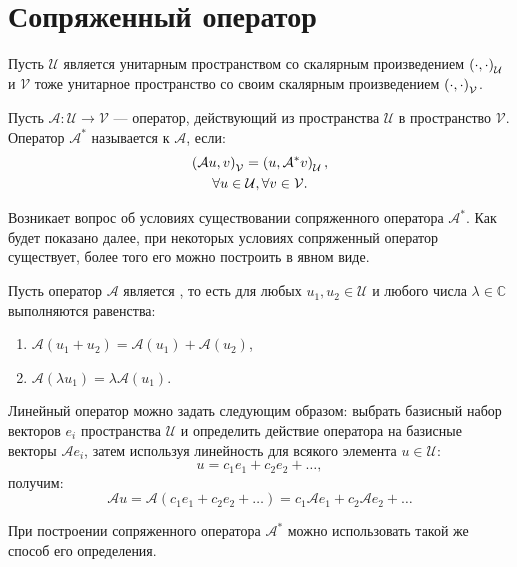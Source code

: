 \section{Сопряженный оператор}

Пусть $\mathcal{U}$ является унитарным пространством со скалярным произведением $\left ( \cdot, \cdot \right )_\mathcal{U}$ и $\mathcal{V}$ тоже унитарное пространство
со своим скалярным произведением $\left ( \cdot, \cdot \right )_\mathcal{V}$.

Пусть $\mathcal{A} : \mathcal{U} \rightarrow \mathcal{V}$ --- оператор, действующий из пространства $\mathcal{U}$ в пространство $\mathcal{V}$.
Оператор $\mathcal{A}^*$ называется  к $\mathcal{A}$, если:
\begin{gather}
    \left ( \mathcal{A} u, v \right )_{\mathcal{V}} = \left ( u, \mathcal{A}^* v \right )_{\mathcal{U}}
    \label{rayleigh:conjugation:scalars_equality}, \\
    \forall u \in \mathcal{U}, \forall v \in \mathcal{V}
    \notag.
\end{gather}

Возникает вопрос об условиях существовании сопряженного оператора $\mathcal{A}^*$. Как будет показано далее, при некоторых условиях сопряженный оператор существует,
более того его можно построить в явном виде.

Пусть оператор $\mathcal{A}$ является , то есть для любых $u_1, u_2 \in \mathcal{U}$ и любого числа $\lambda \in \mathbb{C}$ выполняются равенства:
\begin{enumerate}
    \item $\mathcal{A}(u_1 + u_2) = \mathcal{A}(u_1) + \mathcal{A}(u_2)$,
    \item $\mathcal{A}(\lambda u_1) = \lambda \mathcal{A}(u_1)$.
\end{enumerate}

Линейный оператор можно задать следующим образом: выбрать базисный набор векторов $e_i$ пространства $\mathcal{U}$ и определить действие оператора на базисные векторы
$\mathcal{A} e_i$, затем используя линейность для всякого элемента $u \in \mathcal{U}$:
\[
    u = c_1 e_1 + c_2 e_2 + \dots,
\]
получим:
\[
    \mathcal{A} u
    = \mathcal{A} ( c_1 e_1 + c_2 e_2 + \dots )
    = c_1 \mathcal{A} e_1 + c_2 \mathcal{A} e_2 + \dots
\]

При построении сопряженного оператора $\mathcal{A}^*$ можно использовать такой же способ его определения.

